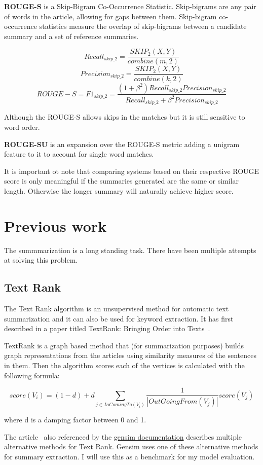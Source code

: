 \textbf{ROUGE-S} is a Skip-Bigram Co-Occurrence Statistic. Skip-bigrams are any pair of words in the article, allowing for gaps between them. Skip-bigram co-occurrence statistics measure the overlap of skip-bigrams between a candidate summary and a set of reference summaries.

\[Recall_{skip\_2} = \frac{SKIP_2(X, Y)}{combine(m, 2)}\]
\[Precision_{skip\_2} = \frac{SKIP_2(X, Y)}{combine(k, 2)}\]
\[ROUGE-S = F1_{skip\_2} = \frac{(1 + \beta^2)Recall_{skip\_2}Precision_{skip\_2}}{Recall_{skip\_2} + \beta^2Precision_{skip\_2}}\]

Although the ROUGE-S allows skips in the matches but it is still sensitive to word order.

\textbf{ROUGE-SU} is an expansion over the ROUGE-S metric adding a unigram feature to it to account for single word matches.

It is important ot note that comparing systems based on their respective ROUGE score is only meaningful if the summaries generated are the same or similar length. Otherwise the longer summary will naturally achieve higher score.

\section{Previous work}
The summmarization is a long standing task. There have been multiple attempts at solving this problem.

\subsection{Text Rank}

The Text Rank algorithm is an unsupervised method for automatic text summarization and it can also be used for keyword extraction. It has first described in a paper titled TextRank: Bringing Order into Texts~\cite{TextRank:2004}.

TextRank is a graph based method that (for summarization purposes) builds graph representations from the articles using similarity measures of the sentences in them. Then the algorithm scores each of the vertices is calculated with the following formula:

\[score(V_i) = (1 - d) + d \sum_{j \in InComingTo(V_i)} \frac{1}{|OutGoingFrom(V_j)|} score(V_j)\]

where d is a damping factor between 0 and 1.

The article~\cite{TextRank} also referenced by the \href{https://radimrehurek.com/gensim/summarization/summariser.html}{gensim documentation} describes multiple alternative methods for Text Rank. Gensim uses one of these alternative methods for summary extraction.
I will use this as a benchmark for my model evaluation.
\FloatBarrier


